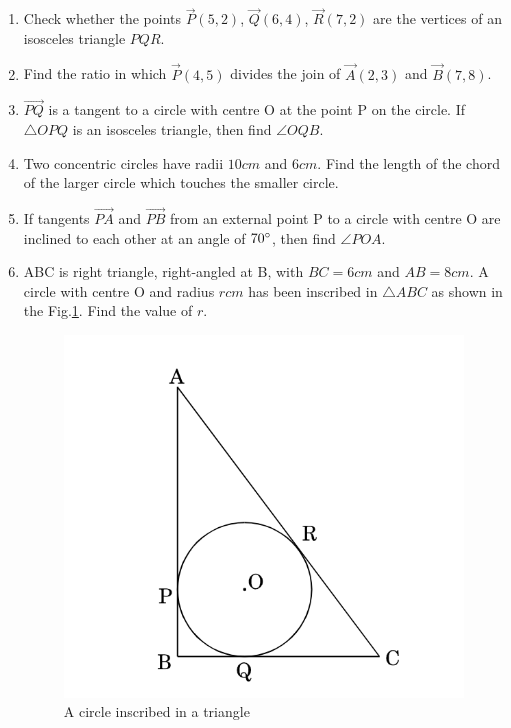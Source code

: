 \documentclass{article}
\begin{document}
\begin{enumerate}
\item Check whether the points $\vec{P}(5, 2)$, $\vec{Q}(6, 4)$, $\vec{R}(7, 2)$ are the vertices of an isosceles triangle $PQR$.

\item Find the ratio in which $\vec{P}(4, 5)$ divides the join of $\vec{A}(2, 3)$ and $\vec{B}(7, 8)$. 
	
\item $ \vec{PQ} $ is a tangent to a circle with centre O at the point P on the circle. If $\triangle OPQ$ is an isosceles triangle, then find $\angle OQB$. 

\item Two concentric circles have radii $10 cm$ and $6 cm$. Find the length of the chord of the larger circle which touches the smaller circle. 

\item If tangents $ \vec{PA} $ and $ \vec{PB} $ from an external point P to a circle with centre O are inclined to each other at an angle of $70\degree$, then find $\angle POA$. 

\item ABC is right triangle, right-angled at B, with $BC = 6 cm$ and $AB = 8 cm$. A circle with centre O and radius $r cm$ has been inscribed in $\triangle ABC$ as shown in the Fig.\ref{fig:4}. Find the value of $r$. 
	\begin{figure}[h]
	\centering
	\includegraphics[width=\columnwidth]{figs/3.jpg}
	\caption{A circle inscribed in a triangle}
	\label{fig:4}
	\end{figure}
	

\end{enumerate}
\end{document}

